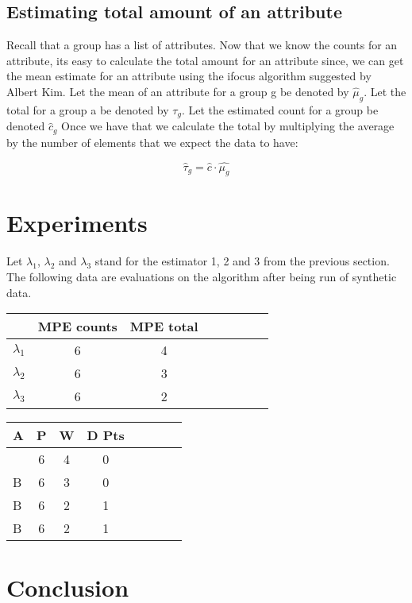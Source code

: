 \documentclass[a4paper]{article}
\begin{document}
\subsection{Estimating total amount of an attribute}

Recall that a group has a list of attributes.
Now that we know the counts for an attribute, its easy to calculate the total amount for an attribute since, we can get the mean estimate for an attribute using the ifocus algorithm suggested by Albert Kim.
Let the mean of an attribute for a group g be denoted by $\hat{\mu}_g$. 
Let the total for a group a be denoted by $\tau_g$.
Let the estimated count for a group be denoted $\hat{c}_g$
Once we have that we calculate the total by multiplying the average by the number of elements that we expect the data to have:

$$\hat{ \tau}_g = \hat{c} \cdot \hat{\mu_g} $$



\section{Experiments}

Let $\lambda_1$, $\lambda_2$ and $\lambda_3$ stand for the estimator 1, 2 and 3 from the previous section.
The following data are evaluations on the algorithm after being run of synthetic data.

\begin{tabular}{l*{6}{c}r}
  & MPE counts & MPE total  \\
\hline
$\lambda_1$ & 6 & 4  \\
$\lambda_2$  & 6 & 3   \\
$\lambda_3$  & 6 & 2    \\
\end{tabular}

\begin{tabular}{l*{6}{c}r}
A  & P & W & D  Pts \\
\hline
  & 6 & 4 & 0  \\
B  & 6 & 3 & 0   \\
B  & 6 & 2 & 1   \\
B  & 6 & 2 & 1  \\
\end{tabular}



\section{Conclusion}
\end{document}
